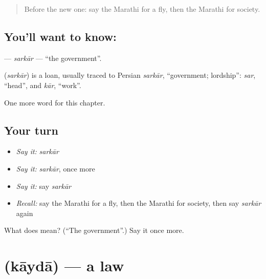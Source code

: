\label{lesson:MR-C262-sarkar}



\begin{quote}
Before the new one: say the Marathi for a fly, then the Marathi for society.
\end{quote}

\subsection*{You'll want to know: }
\textbf{} — \emph{sarkār} — \textquotedblleft{}the government\textquotedblright{}.

\begin{cousinweb}
\textbf{} (\emph{sarkār}) is a loan, usually traced to Persian \emph{sarkār}, \textquotedblleft{}government; lordship\textquotedblright{}: \emph{sar}, \textquotedblleft{}head\textquotedblright{}, and \emph{kār}, \textquotedblleft{}work\textquotedblright{}.
\end{cousinweb}

\begin{grammarlens}[title={What you've built}]
One more word for this chapter.
\end{grammarlens}

\subsection*{Your turn}
\begin{itemize}
\raggedright
  \item \emph{Say it:} \emph{sarkār}
  \item \emph{Say it:} \emph{sarkār}, once more
  \item \emph{Say it:} say \emph{sarkār}
  \item \emph{Recall:} say the Marathi for a fly, then the Marathi for society, then say \emph{sarkār} again
\end{itemize}

\begin{tcolorbox}[breakable,colback=teal!4,colframe=teal!35!black,title={Before you move on}]
What does  mean? (\textquotedblleft{}The government\textquotedblright{}.) Say it once more.
\end{tcolorbox}
\section[\texorpdfstring{\mr{कायदा} (kāydā)}{कायदा (kāydā)}]{ (kāydā) — a law}


